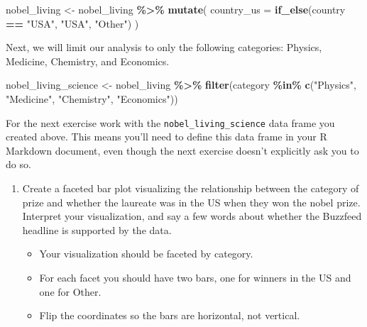 \documentclass[
]{article}
\newenvironment{Shaded}{\begin{snugshade}}{\end{snugshade}}
\newcommand{\AttributeTok}[1]{\textcolor[rgb]{0.13,0.29,0.53}{#1}}
\newcommand{\FunctionTok}[1]{\textcolor[rgb]{0.13,0.29,0.53}{\textbf{#1}}}
\newcommand{\NormalTok}[1]{#1}
\newcommand{\OtherTok}[1]{\textcolor[rgb]{0.56,0.35,0.01}{#1}}
\newcommand{\SpecialCharTok}[1]{\textcolor[rgb]{0.81,0.36,0.00}{\textbf{#1}}}
\newcommand{\StringTok}[1]{\textcolor[rgb]{0.31,0.60,0.02}{#1}}
\providecommand{\tightlist}{%
  \setlength{\itemsep}{0pt}\setlength{\parskip}{0pt}}
\begin{document}
\begin{Shaded}
\begin{Highlighting}[]
\NormalTok{nobel\_living }\OtherTok{\textless{}{-}}\NormalTok{ nobel\_living }\SpecialCharTok{\%\textgreater{}\%}
  \FunctionTok{mutate}\NormalTok{(}
    \AttributeTok{country\_us =} \FunctionTok{if\_else}\NormalTok{(country }\SpecialCharTok{==} \StringTok{"USA"}\NormalTok{, }\StringTok{"USA"}\NormalTok{, }\StringTok{"Other"}\NormalTok{)}
\NormalTok{  )}
\end{Highlighting}
\end{Shaded}

Next, we will limit our analysis to only the following categories:
Physics, Medicine, Chemistry, and Economics.

\begin{Shaded}
\begin{Highlighting}[]
\NormalTok{nobel\_living\_science }\OtherTok{\textless{}{-}}\NormalTok{ nobel\_living }\SpecialCharTok{\%\textgreater{}\%}
  \FunctionTok{filter}\NormalTok{(category }\SpecialCharTok{\%in\%} \FunctionTok{c}\NormalTok{(}\StringTok{"Physics"}\NormalTok{, }\StringTok{"Medicine"}\NormalTok{, }\StringTok{"Chemistry"}\NormalTok{, }\StringTok{"Economics"}\NormalTok{))}
\end{Highlighting}
\end{Shaded}

For the next exercise work with the \texttt{nobel\_living\_science} data
frame you created above. This means you'll need to define this data
frame in your R Markdown document, even though the next exercise doesn't
explicitly ask you to do so.

\begin{enumerate}
\def\labelenumi{\arabic{enumi}.}
\setcounter{enumi}{2}
\item
  Create a faceted bar plot visualizing the relationship between the
  category of prize and whether the laureate was in the US when they won
  the nobel prize. Interpret your visualization, and say a few words
  about whether the Buzzfeed headline is supported by the data.

  \begin{itemize}
  \tightlist
  \item
    Your visualization should be faceted by category.
  \item
    For each facet you should have two bars, one for winners in the US
    and one for Other.
  \item
    Flip the coordinates so the bars are horizontal, not vertical.
  \end{itemize}
\end{enumerate}
\end{document}
